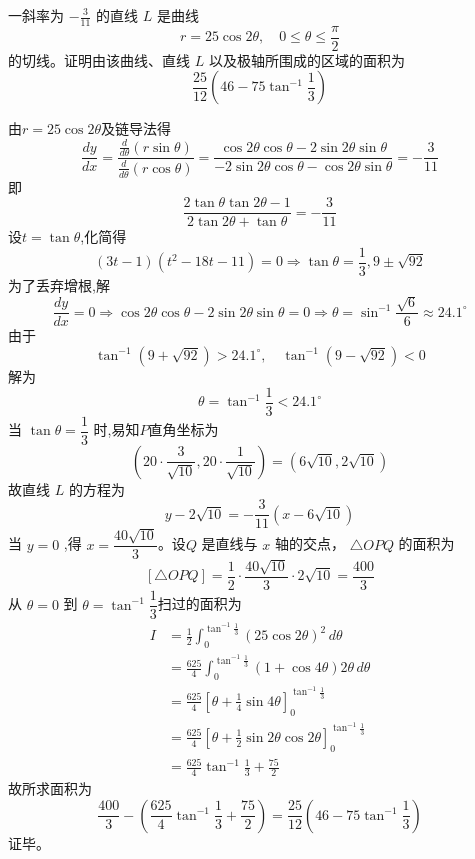 \begin{questions}
    \question 一斜率为 $-\frac{3}{11}$ 的直线 $L$ 是曲线
    \[
    r = 25\cos 2\theta,\quad 0 \le \theta \le \frac{\pi}{2}
    \] 
    的切线。证明由该曲线、直线 $L$ 以及极轴所围成的区域的面积为
    \[ 
    \frac{25}{12} \left( 46 - 75 \tan^{-1} \frac{1}{3} \right) 
    \]
    \begin{solution}
        由$r = 25\cos 2\theta$及链导法得
        \[ 
        \frac{dy}{dx} = \frac{\frac{d}{d\theta}(r \sin \theta)}{\frac{d}{d\theta}(r \cos \theta)} = \frac{\cos 2\theta \cos \theta - 2\sin 2\theta \sin \theta}{-2\sin 2\theta \cos \theta - \cos 2\theta \sin \theta}=-\frac{3}{11}
        \]
        即
        \[
        \frac{2\tan\theta\tan2\theta-1}{2\tan2\theta+\tan\theta}=-\frac{3}{11}
        \]
        设$t=\tan\theta$,化简得
        \[ 
        (3t - 1)(t^2 - 18t - 11) = 0 \Rightarrow \tan \theta = \frac{1}{3},9 \pm \sqrt{92}
        \]
        为了丢弃增根,解
        \[
        \frac{dy}{dx}=0 \Rightarrow \cos 2\theta \cos \theta - 2\sin 2\theta \sin \theta = 0 \Rightarrow \theta = \sin^{-1}\frac{\sqrt{6}}{6} \approx 24.1^\circ
        \]
        由于
        \[
        \tan^{-1}(9+\sqrt{92})>24.1^\circ,\quad \tan^{-1}(9-\sqrt{92})<0
        \]
        解为
        \[
        \theta=\tan^{-1}\frac{1}{3}<24.1^\circ
        \]
        当 $\tan \theta = \dfrac{1}{3}$ 时,易知$P$直角坐标为
        \[
        \left(20\cdot\frac{3}{\sqrt{10}},20\cdot\frac{1}{\sqrt{10}}\right)=(6\sqrt{10}, 2\sqrt{10})
        \]
        故直线 $L$ 的方程为
        \[ 
        y - 2\sqrt{10} = -\frac{3}{11}(x - 6\sqrt{10}) 
        \]
        当 $y = 0$ ,得 $x = \dfrac{40\sqrt{10}}{3}$。设$Q$ 是直线与 $x$ 轴的交点， $\triangle OPQ$ 的面积为
        \[ 
        [\triangle OPQ] = \frac{1}{2} \cdot \frac{40\sqrt{10}}{3} \cdot 2\sqrt{10} = \frac{400}{3} 
        \]
        从 $\theta = 0$ 到 $\theta = \tan^{-1} \dfrac{1}{3}$扫过的面积为
        \begin{align*}
        I &= \frac{1}{2} \int_{0}^{\tan^{-1} \frac{1}{3}} (25 \cos 2\theta)^2\, d\theta \\
        &= \frac{625}{4} \int_{0}^{\tan^{-1} \frac{1}{3}} (1+\cos 4\theta)2\theta\, d\theta \\
        &= \frac{625}{4} \left[ \theta + \frac{1}{4}\sin 4\theta \right]_{0}^{\tan^{-1} \frac{1}{3}} \\
        &= \frac{625}{4} \left[ \theta + \frac{1}{2}\sin 2\theta \cos 2\theta \right]_{0}^{\tan^{-1} \frac{1}{3}} \\
        &= \frac{625}{4} \tan^{-1} \frac{1}{3} + \frac{75}{2} 
        \end{align*}
        故所求面积为
        \[ 
        \frac{400}{3} - \left( \frac{625}{4} \tan^{-1} \frac{1}{3} + \frac{75}{2} \right) = \frac{25}{12} \left( 46 - 75\tan^{-1} \frac{1}{3} \right) 
        \]
        证毕。
    \end{solution}


\end{questions}
